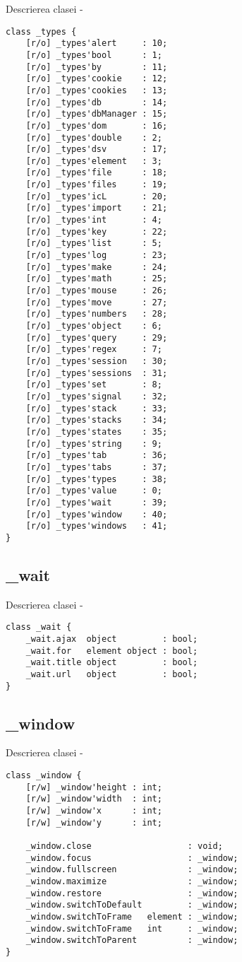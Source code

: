 \noindent Descrierea clasei  -
\begin{lstlisting}[numbers=none]
class _types {
	[r/o] _types'alert     : 10;
	[r/o] _types'bool      : 1;
	[r/o] _types'by        : 11;
	[r/o] _types'cookie    : 12;
	[r/o] _types'cookies   : 13;
	[r/o] _types'db        : 14;
	[r/o] _types'dbManager : 15;
	[r/o] _types'dom       : 16;
	[r/o] _types'double    : 2;
	[r/o] _types'dsv       : 17;
	[r/o] _types'element   : 3;
	[r/o] _types'file      : 18;
	[r/o] _types'files     : 19;
	[r/o] _types'icL       : 20;
	[r/o] _types'import    : 21;
	[r/o] _types'int       : 4;
	[r/o] _types'key       : 22;
	[r/o] _types'list      : 5;
	[r/o] _types'log       : 23;
	[r/o] _types'make      : 24;
	[r/o] _types'math      : 25;
	[r/o] _types'mouse     : 26;
	[r/o] _types'move      : 27;
	[r/o] _types'numbers   : 28;
	[r/o] _types'object    : 6;
	[r/o] _types'query     : 29;
	[r/o] _types'regex     : 7;
	[r/o] _types'session   : 30;
	[r/o] _types'sessions  : 31;
	[r/o] _types'set       : 8;
	[r/o] _types'signal    : 32;
	[r/o] _types'stack     : 33;
	[r/o] _types'stacks    : 34;
	[r/o] _types'states    : 35;
	[r/o] _types'string    : 9;
	[r/o] _types'tab       : 36;
	[r/o] _types'tabs      : 37;
	[r/o] _types'types     : 38;
	[r/o] _types'value     : 0;
	[r/o] _types'wait      : 39;
	[r/o] _types'window    : 40;
	[r/o] _types'windows   : 41;
}
\end{lstlisting}

\subsection{{\color{orange} \_wait}}

\noindent Descrierea clasei  -
\begin{lstlisting}[numbers=none]
class _wait {
	_wait.ajax  object         : bool;
	_wait.for   element object : bool;
	_wait.title object         : bool;
	_wait.url   object         : bool;
}
\end{lstlisting}

\subsection{{\color{orange} \_window}}

\noindent Descrierea clasei  -
\begin{lstlisting}[numbers=none]
class _window {
	[r/w] _window'height : int;
	[r/w] _window'width  : int;
	[r/w] _window'x      : int;
	[r/w] _window'y      : int;
	
	_window.close                   : void;
	_window.focus                   : _window;
	_window.fullscreen              : _window;
	_window.maximize                : _window;
	_window.restore                 : _window;
	_window.switchToDefault         : _window;
	_window.switchToFrame   element : _window;
	_window.switchToFrame   int     : _window;
	_window.switchToParent          : _window;
}
\end{lstlisting}

